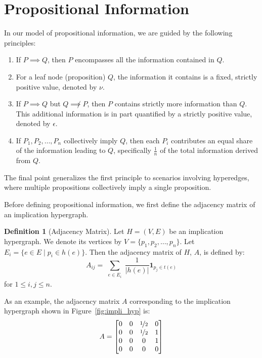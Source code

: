 \documentclass[11pt]{article}
\theoremstyle{definition}
\newtheorem{definition}{Definition}[section]
\theoremstyle{plain}
\theoremstyle{remark}
\begin{document}
\section{Propositional Information}

In our model of propositional information, we are guided by the following principles:

\begin{enumerate}[label=(\roman*)]
    \item If \( P \implies Q \), then \( P \) encompasses all the information contained in \( Q \).
    \item For a leaf node (proposition) \( Q \), the information it contains is a fixed, strictly positive value, denoted by \( \nu \).
    \item If \( P \implies Q \) but \( Q \not\implies P \), then \( P \) contains strictly more information than \( Q \). This additional information is in part quantified by a strictly positive value, denoted by \( \epsilon \).
    \item If \( P_1, P_2, \ldots, P_n \) collectively imply \( Q \), then each \( P_i \) contributes an equal share of the information leading to \( Q \), specifically \(\frac{1}{n}\) of the total information derived from \( Q \).
\end{enumerate}

The final point generalizes the first principle to scenarios involving hyperedges, where multiple propositions collectively imply a single proposition.


Before defining propositional information, we first define the adjacency matrix of an implication hypergraph. 

\begin{definition}[Adjacency Matrix]\label{def:prop_info}
Let \( H = (V, E) \) be an implication hypergraph. We denote its vertices by \( V = \{p_1,p_2,\ldots,p_n\} \). 
Let \( E_i = \{e \in E \mid p_i \in h(e)\} \). Then the adjacency matrix of \( H \), \( A \), is defined by:
\[
A_{ij} = \sum_{\substack{e \in E_i}} \frac{1}{|h(e)|} \mathbf{1}_{p_j \in t(e)}
\]
for \( 1 \leq i, j \leq n \).
\end{definition}

As an example, the adjacency matrix $A$ corresponding to the implication hypergraph shown in Figure~\ref{fig:impli_hyp} is:
\[
A = \begin{bmatrix}
0 & 0 & \nicefrac{1}{2} & 0 \\
0 & 0 & \nicefrac{1}{2} & 1 \\
0 & 0 & 0 & 1 \\
0 & 0 & 0 & 0
\end{bmatrix}
\]
\end{document}
